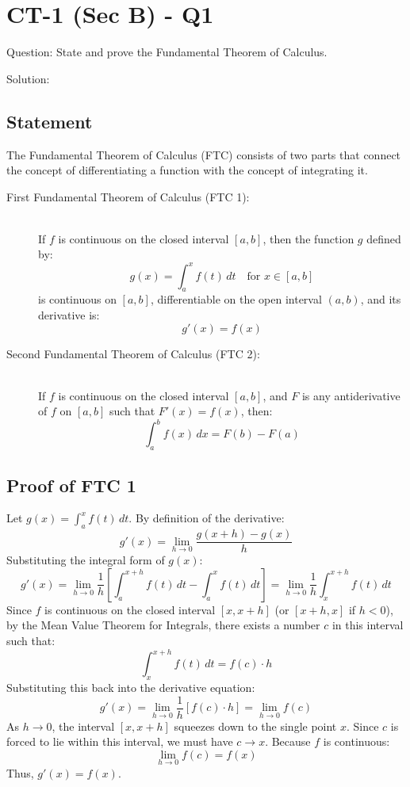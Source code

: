 \documentclass[11pt, a4paper]{article}
\begin{document}

\section*{CT-1 (Sec B) - Q1}

Question:
State and prove the Fundamental Theorem of Calculus.

Solution:

\subsection*{Statement}
The Fundamental Theorem of Calculus (FTC) consists of two parts that connect the concept of differentiating a function with the concept of integrating it.

\begin{description}
    \item[First Fundamental Theorem of Calculus (FTC 1):] \ \\
    If $f$ is continuous on the closed interval $[a, b]$, then the function $g$ defined by:
    \[ g(x) = \int_{a}^{x} f(t) \, dt \quad \text{for } x \in [a, b] \]
    is continuous on $[a, b]$, differentiable on the open interval $(a, b)$, and its derivative is:
    \[ g'(x) = f(x) \]

    \item[Second Fundamental Theorem of Calculus (FTC 2):] \ \\
    If $f$ is continuous on the closed interval $[a, b]$, and $F$ is any antiderivative of $f$ on $[a, b]$ such that $F'(x) = f(x)$, then:
    \[ \int_{a}^{b} f(x) \, dx = F(b) - F(a) \]
\end{description}

\subsection*{Proof of FTC 1}
Let $g(x) = \int_{a}^{x} f(t) \, dt$. By definition of the derivative:
\[ g'(x) = \lim_{h \to 0} \frac{g(x+h) - g(x)}{h} \]
Substituting the integral form of $g(x)$:
\[ g'(x) = \lim_{h \to 0} \frac{1}{h} \left[ \int_{a}^{x+h} f(t) \, dt - \int_{a}^{x} f(t) \, dt \right] = \lim_{h \to 0} \frac{1}{h} \int_{x}^{x+h} f(t) \, dt \]
Since $f$ is continuous on the closed interval $[x, x+h]$ (or $[x+h, x]$ if $h < 0$), by the Mean Value Theorem for Integrals, there exists a number $c$ in this interval such that:
\[ \int_{x}^{x+h} f(t) \, dt = f(c) \cdot h \]
Substituting this back into the derivative equation:
\[ g'(x) = \lim_{h \to 0} \frac{1}{h} [f(c) \cdot h] = \lim_{h \to 0} f(c) \]
As $h \to 0$, the interval $[x, x+h]$ squeezes down to the single point $x$. Since $c$ is forced to lie within this interval, we must have $c \to x$. Because $f$ is continuous:
\[ \lim_{h \to 0} f(c) = f(x) \]
Thus, $g'(x) = f(x)$.
\end{document}
